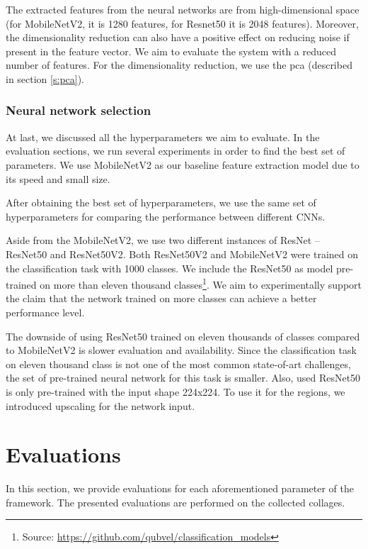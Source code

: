The extracted features from the neural networks are from high-dimensional space (for MobileNetV2, it is 1280 features, for Resnet50 it is 2048 features). Moreover, the dimensionality reduction can also have a positive effect on reducing noise if present in the feature vector. We aim to evaluate the system with a reduced number of features. For the dimensionality reduction, we use the \acrlong{pca} (described in section \ref{s:pca}).

\subsection{Neural network selection}

At last, we discussed all the hyperparameters we aim to evaluate. In the evaluation sections, we run several experiments in order to find the best set of parameters. We use MobileNetV2 as our baseline feature extraction model due to its speed and small size.

After obtaining the best set of hyperparameters, we use the same set of hyperparameters for comparing the performance between different CNNs.

Aside from the MobileNetV2, we use two different instances of ResNet -- ResNet50 and ResNet50V2. Both ResNet50V2 and MobileNetV2 were trained on the classification task with 1000 classes. We include the ResNet50 as model pre-trained on more than eleven thousand classes\footnote{Source: \url{https://github.com/qubvel/classification\_models}}. We aim to experimentally support the claim that the network trained on more classes can achieve a better performance level. 

The downside of using ResNet50 trained on eleven thousands of classes compared to MobileNetV2 is slower evaluation and availability. Since the classification task on eleven thousand class is not one of the most common state-of-art challenges, the set of pre-trained neural network for this task is smaller. Also, used ResNet50 is only pre-trained with the input shape 224x224. To use it for the regions, we introduced upscaling for the network input. 

\chapter{Evaluations}
\label{ch:evaluation}

In this section, we provide evaluations for each aforementioned parameter of the framework. The presented evaluations are performed on the collected collages.

